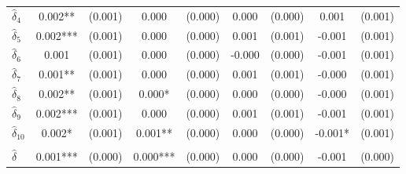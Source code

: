 {\begin{tabular}{l*{4}{cc}}
$\hat{\delta}_4$&       0.002** &     (0.001)&       0.000   &     (0.000)&       0.000   &     (0.000)&       0.001   &     (0.001)\\
$\hat{\delta}_5$&       0.002***&     (0.001)&       0.000   &     (0.000)&       0.001   &     (0.001)&      -0.001   &     (0.001)\\
$\hat{\delta}_6$&       0.001   &     (0.001)&       0.000   &     (0.000)&      -0.000   &     (0.000)&      -0.001   &     (0.001)\\
$\hat{\delta}_7$&       0.001** &     (0.001)&       0.000   &     (0.000)&       0.001   &     (0.001)&      -0.000   &     (0.001)\\
$\hat{\delta}_8$&       0.002** &     (0.001)&       0.000*  &     (0.000)&       0.000   &     (0.000)&      -0.000   &     (0.001)\\
$\hat{\delta}_9$&       0.002***&     (0.001)&       0.000   &     (0.000)&       0.001   &     (0.001)&      -0.001   &     (0.001)\\
$\hat{\delta}_{10}$&       0.002*  &     (0.001)&       0.001** &     (0.000)&       0.000   &     (0.000)&      -0.001*  &     (0.001)\\
\addlinespace&               &            &               &            &               &            &               &            \\
$\hat{\delta}$&       0.001***&     (0.000)&       0.000***&     (0.000)&       0.000   &     (0.000)&      -0.001   &     (0.000)\\
\bottomrule
\end{tabular}
}
